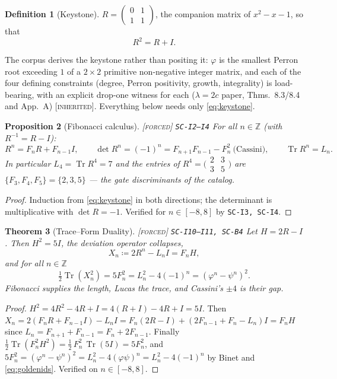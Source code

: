 \documentclass[11pt]{article}
\newcommand{\tagF}{\textcolor{cF}{\textsc{[forced]}}}
\newcommand{\tagI}{\textcolor{cI}{\textsc{[inherited]}}}
\newcommand{\hx}[1]{\textcolor{cC}{\footnotesize\texttt{#1}}}
\newcommand{\Z}{\mathbb{Z}}
\newcommand{\gp}{\varphi}
\newcommand{\gq}{\psi}
\newcommand{\Tr}{\operatorname{Tr}}
\theoremstyle{plain}
\newtheorem{theorem}{Theorem}[section]
\newtheorem{proposition}[theorem]{Proposition}
\theoremstyle{definition}
\newtheorem{definition}[theorem]{Definition}
\theoremstyle{remark}
\begin{document}
\begin{definition}[Keystone]\label{def:keystone}
$R=\begin{pmatrix}0&1\\ 1&1\end{pmatrix}$, the companion matrix of $x^2-x-1$, so that
\begin{equation}\label{eq:keystone}
R^2=R+I .
\end{equation}
\end{definition}

The corpus derives the keystone rather than positing it: $\gp$ is the smallest Perron
root exceeding $1$ of a $2\times2$ primitive non-negative integer matrix, and each of
the four defining constraints (degree, Perron positivity, growth, integrality) is
load-bearing, with an explicit drop-one witness for each ($\lambda{=}2c$ paper,
Thms.\ 8.3/8.4 and App.\ A) \tagI{}. Everything below needs only \eqref{eq:keystone}.

\begin{proposition}[Fibonacci calculus]\label{prop:fibcalc}\tagF{} \hx{SC-I2--I4}
For all $n\in\Z$ (with $R^{-1}=R-I$):
\[
R^n=F_nR+F_{n-1}I,\qquad
\det R^n=(-1)^n=F_{n+1}F_{n-1}-F_n^2\ \text{(Cassini)},\qquad
\Tr R^n=L_n .
\]
In particular $L_4=\Tr R^4=7$ and the entries of
$R^4=\bigl(\begin{smallmatrix}2&3\\3&5\end{smallmatrix}\bigr)$
are $\{F_3,F_4,F_5\}=\{2,3,5\}$ --- the gate discriminants of the catalog.
\end{proposition}

\begin{proof}
Induction from \eqref{eq:keystone} in both directions; the determinant is
multiplicative with $\det R=-1$. Verified for $n\in[-8,8]$ by \hx{SC-I3, SC-I4}.
\end{proof}

\begin{theorem}[Trace--Form Duality]\label{thm:tfd}\tagF{} \hx{SC-I10--I11, SC-B4}
Let $H=2R-I$. Then $H^2=5I$, the deviation operator collapses,
\[
X_n \coloneqq 2R^n-L_nI = F_nH ,
\]
and for all $n\in\Z$
\begin{equation}\label{eq:tfd}
\tfrac12\Tr(X_n^2)=5F_n^2=L_n^2-4(-1)^n=(\gp^n-\gq^n)^2 .
\end{equation}
Fibonacci supplies the length, Lucas the trace, and Cassini's $\pm4$ is their gap.
\end{theorem}

\begin{proof}
$H^2=4R^2-4R+I=4(R+I)-4R+I=5I$. Then
$X_n=2(F_nR+F_{n-1}I)-L_nI=F_n(2R-I)+(2F_{n-1}+F_n-L_n)I=F_nH$ since
$L_n=F_{n+1}+F_{n-1}=F_n+2F_{n-1}$. Finally
$\tfrac12\Tr(F_n^2H^2)=\tfrac12\,F_n^2\,\Tr(5I)=5F_n^2$, and
$5F_n^2=(\gp^n-\gq^n)^2=L_n^2-4(\gp\gq)^n=L_n^2-4(-1)^n$ by Binet and
\eqref{eq:goldenids}. Verified on $n\in[-8,8]$.
\end{proof}
\end{document}
